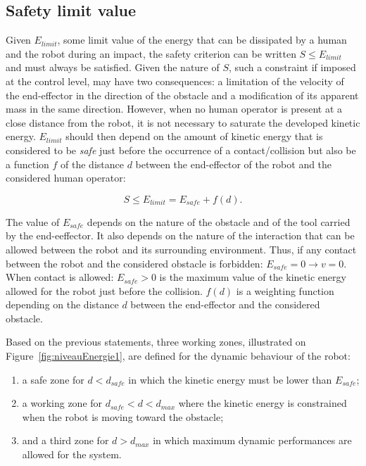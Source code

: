 \documentclass[a4paper, 10pt, conference]{ieeeconf}      %
\begin{document}
\subsection{Safety limit value}
Given $E_{limit}$, some limit value of the energy that can be dissipated by a human and the robot during an impact, the safety criterion can be written $S \leq  E_{limit}$ and must always be satisfied. Given the nature of $S$, such a constraint if imposed at the control level, may have two consequences: a limitation of the velocity of the end-effector in the direction of the obstacle and a modification of its apparent mass in the same direction. However, when no human operator is present at a close distance from the robot, it is not necessary to saturate the developed kinetic energy. $E_{limit}$ should then depend on the amount of kinetic energy that is considered to be \textit{safe} just before the occurrence of a contact/collision but also be a function $f$ of the distance $d$ between the end-effector of the robot and the considered human operator:

\begin{equation}
 S \leq E_{limit} = E_{safe} + f(d).
\end{equation}

The value of $E_{safe}$ depends on the nature of the obstacle and of the tool carried by the end-eeffector. It also depends on the nature of the interaction that can be allowed between the robot and its surrounding environment. Thus, if any contact between the robot and the considered obstacle is forbidden: $E_{safe} = 0 \rightarrow v=0$. When contact is allowed: $E_{safe} > 0$ is the maximum value of the kinetic energy allowed for the robot just before the collision. $f(d)$ is a weighting function depending on the distance $d$ between the end-effector and the considered obstacle.

Based on the previous statements, three working zones, illustrated on Figure~\ref{fig:niveauEnergie1}, are defined for the dynamic behaviour of the robot:
\begin{enumerate}
\item a safe zone for $d < d_{safe}$ in which the kinetic energy must be lower than $E_{safe}$;
\item a working zone for $d_{safe} < d < d_{max}$ where the kinetic energy is constrained when the robot is moving toward the obstacle;
\item and a third zone for $d > d_{max}$ in which maximum dynamic performances are allowed for the system.
\end{enumerate}
\end{document}
